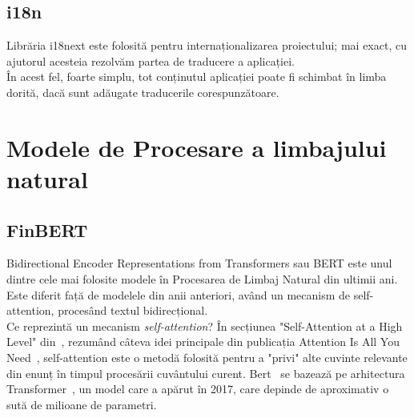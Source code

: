 \subsection{i18n}
Librăria i18next este folosită pentru internaționalizarea proiectului; mai exact, cu ajutorul acesteia rezolvăm partea de traducere a aplicației.\\
În acest fel, foarte simplu, tot conținutul aplicației poate fi schimbat în limba dorită, dacă sunt adăugate traducerile corespunzătoare.
\section{Modele de Procesare a limbajului natural}
\subsection{FinBERT}
Bidirectional Encoder Representations from Transformers sau BERT este unul dintre cele mai folosite modele în Procesarea de Limbaj Natural din ultimii ani.
Este diferit față de modelele din anii anteriori, având un mecanism de self-attention, procesând textul bidirecțional.\\

Ce reprezintă un mecanism {\it self-attention}? În secțiunea "Self-Attention at a High Level" din~\cite{IllustratedTransformer},
rezumând câteva idei principale din publicația Attention Is All You Need~\cite{TransformerModel}, self-attention este o metodă folosită pentru a "privi" alte cuvinte relevante din enunț în timpul procesării cuvântului curent.
Bert~\cite{BERT} se bazează pe arhitectura Transformer~\cite{TransformerModel}, un model care a apărut în 2017, care depinde de aproximativ o sută de milioane de parametri.\\

